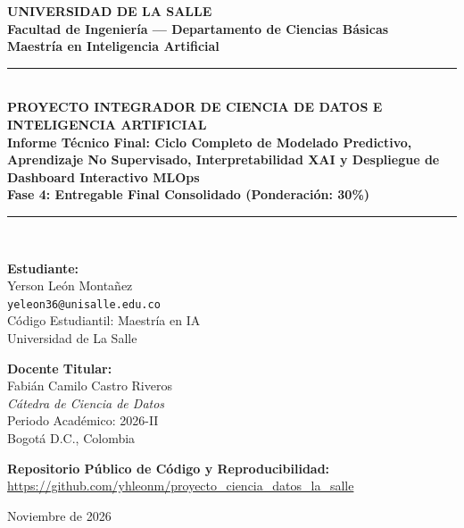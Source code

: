 \documentclass[11pt,letterpaper]{article}
\begin{document}
\begin{titlepage}
    \centering
    \vspace*{0.5cm}
    {\huge \textbf{\textcolor{lasalleblue}{UNIVERSIDAD DE LA SALLE}}}\\[0.3cm]
    {\large \textbf{Facultad de Ingeniería — Departamento de Ciencias Básicas}}\\[0.2cm]
    {\large \textbf{Maestría en Inteligencia Artificial}}\\[1.5cm]

    \rule{\linewidth}{1.5pt}\\[0.4cm]
    {\LARGE \textbf{\textcolor{lasalleblue}{PROYECTO INTEGRADOR DE CIENCIA DE DATOS E INTELIGENCIA ARTIFICIAL}}}\\[0.3cm]
    {\Large \textbf{Informe Técnico Final: Ciclo Completo de Modelado Predictivo, Aprendizaje No Supervisado, Interpretabilidad XAI y Despliegue de Dashboard Interactivo MLOps}}\\[0.2cm]
    {\normalsize \textbf{Fase 4: Entregable Final Consolidado (Ponderación: 30\%)}}\\[0.4cm]
    \rule{\linewidth}{1.5pt}\\[1.5cm]

    \begin{minipage}[t]{0.48\textwidth}
        \textbf{Estudiante:}\\
        Yerson León Montañez\\
        \texttt{yeleon36@unisalle.edu.co}\\
        Código Estudiantil: Maestría en IA\\
        Universidad de La Salle
    \end{minipage}
    \hfill
    \begin{minipage}[t]{0.48\textwidth}
        \begin{flushright}
            \textbf{Docente Titular:}\\
            Fabián Camilo Castro Riveros\\
            \textit{Cátedra de Ciencia de Datos}\\
            Periodo Académico: 2026-II\\
            Bogotá D.C., Colombia
        \end{flushright}
    \end{minipage}

    \vfill
    \begin{center}
        \textbf{Repositorio Público de Código y Reproducibilidad:}\\
        \url{https://github.com/yhleonm/proyecto_ciencia_datos_la_salle}
    \end{center}
    \vspace*{0.5cm}
    {\large Noviembre de 2026}
\end{titlepage}
\end{document}
